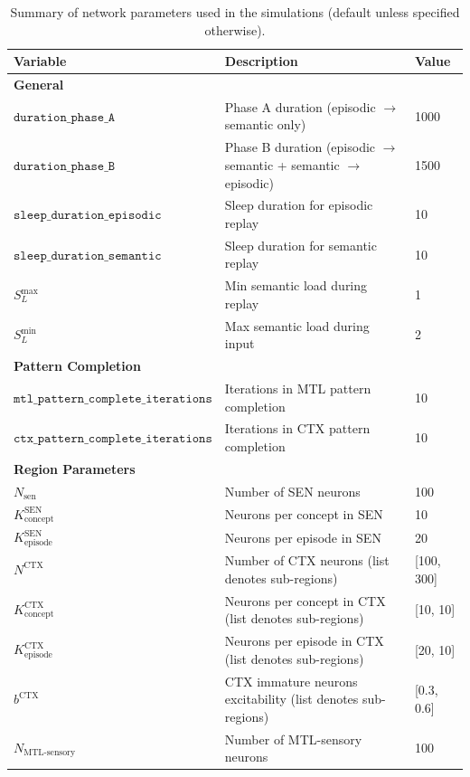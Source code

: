 \documentclass{article}
\begin{document}
\begin{table}[ht]
\small
\centering
\caption{Summary of network parameters used in the simulations (default unless specified otherwise).}
\label{tab:default_model}
\begin{tabular}{lp{6cm}l}
\toprule
\textbf{Variable} & \textbf{Description} & \textbf{Value} \\
\midrule
\multicolumn{3}{l}{\textbf{General}} \\
\midrule
$\texttt{duration\_phase\_A}$ & Phase A duration (episodic $\to$ semantic only) & 1000 \\
$\texttt{duration\_phase\_B}$ & Phase B duration (episodic $\to$ semantic + semantic $\to$ episodic) & 1500 \\
$\texttt{sleep\_duration\_episodic}$ & Sleep duration for episodic replay & 10 \\
$\texttt{sleep\_duration\_semantic}$ & Sleep duration for semantic replay & 10 \\
$S_L^\textrm{max}$ & Min semantic load during replay & 1 \\
$S_L^\textrm{min}$ & Max semantic load during input & 2 \\
\midrule
\multicolumn{3}{l}{\textbf{Pattern Completion}} \\
\midrule
$\texttt{mtl\_pattern\_complete\_iterations}$ & Iterations in MTL pattern completion & 10 \\
$\texttt{ctx\_pattern\_complete\_iterations}$ & Iterations in CTX pattern completion & 10 \\
\midrule
\multicolumn{3}{l}{\textbf{Region Parameters}} \\
\midrule
$N_{\text{sen}}$ & Number of SEN neurons & 100 \\
$K^\textrm{SEN}_\textrm{concept}$ & Neurons per concept in SEN & 10 \\
$K^\textrm{SEN}_\textrm{episode}$ & Neurons per episode in SEN & 20 \\
$N^{\text{CTX}}$ & Number of CTX neurons (list denotes sub-regions) & [100, 300] \\
$K^\textrm{CTX}_\textrm{concept}$ & Neurons per concept in CTX (list denotes sub-regions) & [10,  10] \\
$K^\textrm{CTX}_\textrm{episode}$ & Neurons per episode in CTX (list denotes sub-regions) & [20,  10] \\
$b^\text{CTX}$ & CTX immature neurons excitability (list denotes sub-regions) & [0.3, 0.6] \\
$N_{\text{MTL-sensory}}$ & Number of MTL-sensory neurons & 100 \\

\end{tabular}
\end{table}
\end{document}
